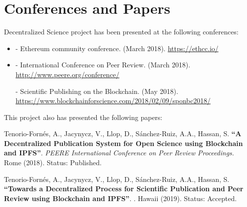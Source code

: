 \cleardoublepage



\section{Conferences and Papers}

Decentralized Science project has been presented at the following conferences:

\begin{itemize}
\item {} - Ethereum community conference.  (March
  2018). \url{https://ethcc.io/}

\item {} - International Conference on Peer Review. 
  (March 2018). \url{http://www.peere.org/conference/}

   - Scientific Publishing on the Blockchain.  (May 2018).
  \url{https://www.blockchainforscience.com/2018/02/09/sponbc2018/}
\end{itemize}

This project also has presented the following papers:

\begin{minipage}{\linewidth}
  Tenorio-Fornés, A., Jacynycz, V., Llop, D., Sánchez-Ruiz, A.A., Hassan, S.
  \textbf{``A Decentralized Publication System for Open Science using Blockchain
    and IPFS''}. \emph{PEERE International Conference on Peer Review
    Proceedings.} Rome (2018). Status: Published.
\end{minipage}

\mbox{}

\begin{minipage}{\linewidth}
  Tenorio-Fornés, A., Jacynycz, V., Llop, D., Sánchez-Ruiz, A.A., Hassan, S.
  \textbf{``Towards a Decentralized Process for Scientific Publication and Peer
    Review using Blockchain and IPFS''}. . Hawaii (2019). Status: Accepted.
\end{minipage}


